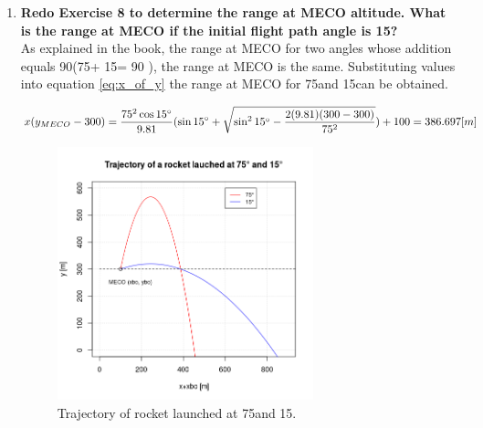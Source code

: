 \begin{enumerate}
\begin{equation}
	y_{max}  =  y_{bo} + \frac{v_{bo}^2 \sin^2\theta}{2g}
\end{equation}

\begin{equation}
	y_{max}  =  300 + \frac{75^2 \sin^2 75\degree}{2(9.81)} = 567.49 [m]
\end{equation}	

This value can also be observed in figure \ref{fig:exercises_8_9_10}.

	\item {\bf Redo Exercise 8 to determine the range at MECO altitude. What is the range at MECO if the initial flight path angle is 15\degree ?}\\
	
As explained in the book, the range at MECO for two angles whose addition equals 90\degree (75\degree + 15\degree = 90 \degree), the range at MECO is the same. Substituting values into equation \ref{eq:x_of_y} the range at MECO for 75\degree and 15\degree can be obtained.

\begin{equation}
	x(y_{MECO}-300)  = \frac{75^2 \cos15\degree}{9.81}(\sin15\degree + \sqrt{\sin^2 15\degree -\frac{2(9.81)(300-300)}{75^2}})+ 100 = 386.697 [m]
\end{equation}	
	
\begin{figure}[H]
	\centering
	\includegraphics[width=0.7\textwidth]{exercises_8_9_10.png}
	\caption{Trajectory of rocket launched at 75\degree and 15\degree .}
	\label{fig:exercises_8_9_10}
\end{figure}


\end{enumerate}
